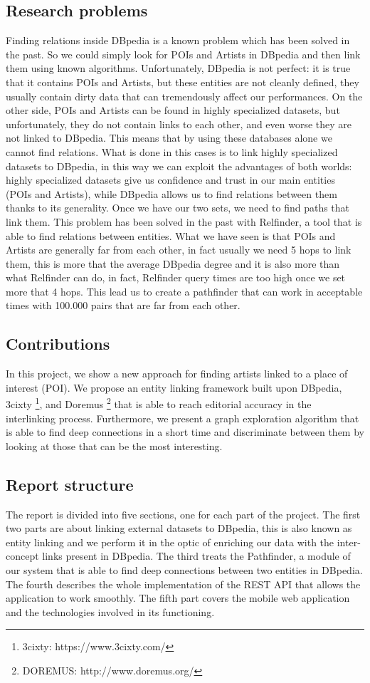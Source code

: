 \documentclass[paper=a4, fontsize=11pt]{scrartcl}
\begin{document}
\subsection{Research problems}
Finding relations inside DBpedia is a known problem which has been solved in the past. So we could simply look for POIs and Artists in DBpedia and then link them using known algorithms.
Unfortunately, DBpedia is not perfect: it is true that it contains POIs and Artists, but these entities are not cleanly defined, they usually contain dirty data that can tremendously affect our performances.
On the other side, POIs and Artists can be found in highly specialized datasets, but unfortunately, they do not contain links to each other, and even worse they are not linked to DBpedia. This means that by using these databases alone we cannot find relations.
What is done in this cases is to link highly specialized datasets to DBpedia, in this way we can exploit the advantages of both worlds: highly specialized datasets give us confidence and trust in our main entities (POIs and Artists), while DBpedia allows us to find relations between them thanks to its generality.
Once we have our two sets, we need to find paths that link them. This problem has been solved in the past with Relfinder, a tool that is able to find relations between entities.
What we have seen is that POIs and Artists are generally far from each other, in fact usually we need 5 hops to link them, this is more that the average DBpedia degree and it is also more than what Relfinder can do, in fact, Relfinder query times are too high once we set more that 4 hops. This lead us to create a pathfinder that can work in acceptable times with 100.000 pairs that are far from each other.

\subsection{Contributions}
In this project, we show a new approach for finding artists linked to a place of interest (POI). We propose an entity linking framework built upon DBpedia, 3cixty \footnote{3cixty: https://www.3cixty.com/}, and Doremus \footnote{DOREMUS: http://www.doremus.org/} that is able to reach editorial accuracy in the interlinking process. Furthermore, we present a graph exploration algorithm that is able to find deep connections in a short time and discriminate between them by looking at those that can be the most interesting. 

\subsection{Report structure}
The report is divided into five sections, one for each part of the project. The first two parts are about linking external datasets to DBpedia, this is also known as entity linking and we perform it in the optic of enriching our data with the inter-concept links present in DBpedia.
The third treats the Pathfinder, a module of our system that is able to find deep connections between two entities in DBpedia.
The fourth describes the whole implementation of the REST API that allows the application to work smoothly.
The fifth part covers the mobile web application and the technologies involved in its functioning.
\end{document}
